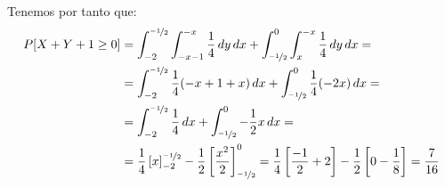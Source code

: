 \documentclass[12pt]{article}
\begin{document}
\begin{ejercicio}
\begin{enumerate}
            Tenemos por tanto que:
            \begin{align*}
                P[X + Y + 1 \geq 0] &= \int_{-2}^{\nicefrac{-1}{2}} \int_{-x-1}^{-x} \dfrac{1}{4} \, dy \, dx + \int_{\nicefrac{-1}{2}}^{0} \int_{x}^{-x} \dfrac{1}{4} \, dy \, dx
                =\\&= \int_{-2}^{\nicefrac{-1}{2}} \dfrac{1}{4}(-x+1+x) \, dx + \int_{\nicefrac{-1}{2}}^{0} \dfrac{1}{4}(-2x) \, dx
                =\\&= \int_{-2}^{\nicefrac{-1}{2}} \dfrac{1}{4} \, dx + \int_{\nicefrac{-1}{2}}^{0} -\dfrac{1}{2}x \, dx
                =\\&= \dfrac{1}{4}\left[x\right]_{-2}^{\nicefrac{-1}{2}} - \dfrac{1}{2}\left[\dfrac{x^2}{2}\right]_{\nicefrac{-1}{2}}^{0}
                = \dfrac{1}{4}\left[\dfrac{-1}{2}+2\right] - \dfrac{1}{2}\left[0 - \dfrac{1}{8}\right] = \dfrac{7}{16}
            \end{align*}
        \end{enumerate}
    \end{ejercicio}
\end{document}
